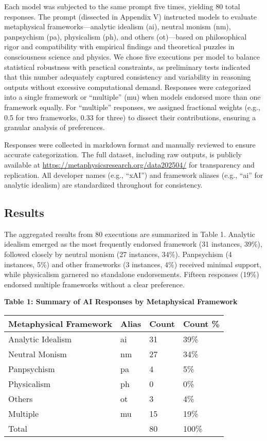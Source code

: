 Each model was subjected to the same prompt five times, yielding 80
total responses. The prompt (dissected in Appendix V) instructed models
to evaluate metaphysical frameworks---analytic idealism (ai), neutral
monism (nm), panpsychism (pa), physicalism (ph), and others (ot)---based
on philosophical rigor and compatibility with empirical findings and
theoretical puzzles in consciousness science and physics. We chose five
executions per model to balance statistical robustness with practical
constraints, as preliminary tests indicated that this number adequately
captured consistency and variability in reasoning outputs without
excessive computational demand. Responses were categorized into a single
framework or ``multiple'' (mu) when models endorsed more than one
framework equally. For ``multiple'' responses, we assigned fractional
weights (e.g., 0.5 for two frameworks, 0.33 for three) to dissect their
contributions, ensuring a granular analysis of preferences.

Responses were collected in markdown format and manually reviewed to
ensure accurate categorization. The full dataset, including raw outputs,
is publicly available at
\url{https://metaphysicsresearch.org/data202504/} for transparency and
replication. All developer names (e.g., ``xAI'') and framework aliases
(e.g., ``ai'' for analytic idealism) are standardized throughout for
consistency.

\subsection{Results}\label{results}

The aggregated results from 80 executions are summarized in Table 1.
Analytic idealism emerged as the most frequently endorsed framework (31
instances, 39\%), followed closely by neutral monism (27 instances,
34\%). Panpsychism (4 instances, 5\%) and other frameworks (3 instances,
4\%) received minimal support, while physicalism garnered no standalone
endorsements. Fifteen responses (19\%) endorsed multiple frameworks
without a clear preference.

\textbf{Table 1: Summary of AI Responses by Metaphysical Framework}

\begin{longtable}[]{@{}llll@{}}
\toprule\noalign{}
Metaphysical Framework & Alias & Count & Count \% \\
\midrule\noalign{}
\endhead
\bottomrule\noalign{}
\endlastfoot
Analytic Idealism & ai & 31 & 39\% \\
Neutral Monism & nm & 27 & 34\% \\
Panpsychism & pa & 4 & 5\% \\
Physicalism & ph & 0 & 0\% \\
Others & ot & 3 & 4\% \\
Multiple & mu & 15 & 19\% \\
Total & & 80 & 100\% \\
\end{longtable}

